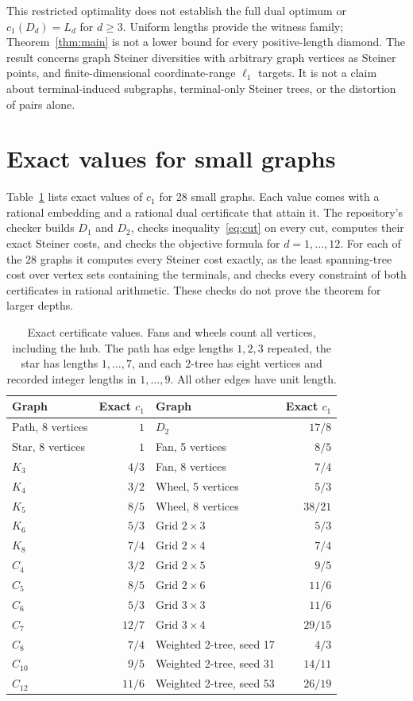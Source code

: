 \documentclass[11pt]{article}
\begin{document}
This restricted optimality does not establish the full dual optimum or
$c_1(D_d)=L_d$ for $d\ge3$. Uniform lengths provide the witness family;
Theorem~\ref{thm:main} is not a lower bound for every positive-length diamond.
The result concerns graph Steiner diversities with arbitrary graph vertices
as Steiner points, and finite-dimensional coordinate-range $\ell_1$ targets.
It is not a claim about terminal-induced subgraphs, terminal-only Steiner
trees, or the distortion of pairs alone.

\section{Exact values for small graphs}\label{sec:finite}
Table~\ref{tab:cases} lists exact values of $c_1$ for 28 small graphs. Each
value comes with a rational embedding and a rational dual certificate that
attain it. The repository's checker builds $D_1$ and $D_2$, checks
inequality~\eqref{eq:cut} on every cut, computes their exact Steiner costs,
and checks the objective formula for $d=1,\ldots,12$. For each of the 28
graphs it computes every Steiner cost exactly, as the least spanning-tree cost
over vertex sets containing the terminals, and checks every constraint of
both certificates in rational arithmetic. These checks do not prove the
theorem for larger depths.

\begin{table}[tb]
\centering
\begin{tabular}{lr@{\qquad}lr}
\hline
Graph & Exact $c_1$ & Graph & Exact $c_1$\\
\hline
Path, 8 vertices & $1$ & $D_2$ & $17/8$\\
Star, 8 vertices & $1$ & Fan, 5 vertices & $8/5$\\
$K_3$ & $4/3$ & Fan, 8 vertices & $7/4$\\
$K_4$ & $3/2$ & Wheel, 5 vertices & $5/3$\\
$K_5$ & $8/5$ & Wheel, 8 vertices & $38/21$\\
$K_6$ & $5/3$ & Grid $2\times3$ & $5/3$\\
$K_8$ & $7/4$ & Grid $2\times4$ & $7/4$\\
$C_4$ & $3/2$ & Grid $2\times5$ & $9/5$\\
$C_5$ & $8/5$ & Grid $2\times6$ & $11/6$\\
$C_6$ & $5/3$ & Grid $3\times3$ & $11/6$\\
$C_7$ & $12/7$ & Grid $3\times4$ & $29/15$\\
$C_8$ & $7/4$ & Weighted 2-tree, seed 17 & $4/3$\\
$C_{10}$ & $9/5$ & Weighted 2-tree, seed 31 & $14/11$\\
$C_{12}$ & $11/6$ & Weighted 2-tree, seed 53 & $26/19$\\
\hline
\end{tabular}
\caption{Exact certificate values. Fans and wheels count all vertices,
including the hub. The path has edge lengths $1,2,3$ repeated, the star has
lengths $1,\ldots,7$, and each 2-tree has eight vertices and recorded integer
lengths in $1,\ldots,9$. All other edges have unit length.}
\label{tab:cases}
\end{table}
\end{document}
